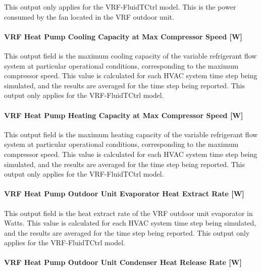 This output only applies for the VRF-FluidTCtrl model. This is the power consumed by the fan located in the VRF outdoor unit.

\paragraph{VRF Heat Pump Cooling Capacity at Max Compressor Speed {[}W{]}}\label{vrf-heat-pump-cooling-capacity-at-max-compressor-speed}

This output field is the maximum cooling capacity of the variable refrigerant flow system at particular operational conditions, corresponding to the maximum compressor speed. This value is calculated for each HVAC system time step being simulated, and the results are averaged for the time step being reported. This output only applies for the VRF-FluidTCtrl model.

\paragraph{VRF Heat Pump Heating Capacity at Max Compressor Speed {[}W{]}}\label{vrf-heat-pump-heating-capacity-at-max-compressor-speed}

This output field is the maximum heating capacity of the variable refrigerant flow system at particular operational conditions, corresponding to the maximum compressor speed. This value is calculated for each HVAC system time step being simulated, and the results are averaged for the time step being reported. This output only applies for the VRF-FluidTCtrl model.

\paragraph{VRF Heat Pump Outdoor Unit Evaporator Heat Extract Rate {[}W{]}}\label{vrf-heat-pump-outdoor-unit-evaporator-heat-extract-rate}

This output field is the heat extract rate of the VRF outdoor unit evaporator in Watts. This value is calculated for each HVAC system time step being simulated, and the results are averaged for the time step being reported. This output only applies for the VRF-FluidTCtrl model.

\paragraph{VRF Heat Pump Outdoor Unit Condenser Heat Release Rate {[}W{]}}\label{vrf-heat-pump-outdoor-unit-condenser-heat-release-rate}

